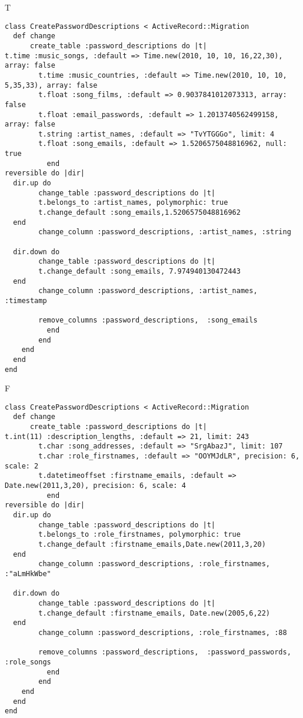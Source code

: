T
\begin{verbatim}
class CreatePasswordDescriptions < ActiveRecord::Migration
  def change
	  create_table :password_descriptions do |t|
t.time :music_songs, :default => Time.new(2010, 10, 10, 16,22,30), array: false
		t.time :music_countries, :default => Time.new(2010, 10, 10, 5,35,33), array: false
		t.float :song_films, :default => 0.9037841012073313, array: false
		t.float :email_passwords, :default => 1.2013740562499158, array: false
		t.string :artist_names, :default => "TvYTGGGo", limit: 4
		t.float :song_emails, :default => 1.5206575048816962, null: true
		  end
reversible do |dir|
  dir.up do
		change_table :password_descriptions do |t|
		t.belongs_to :artist_names, polymorphic: true
 		t.change_default :song_emails,1.5206575048816962
  end
 		change_column :password_descriptions, :artist_names, :string
   
  dir.down do
		change_table :password_descriptions do |t|
		t.change_default :song_emails, 7.974940130472443
  end
 		change_column :password_descriptions, :artist_names, :timestamp
   
		remove_columns :password_descriptions,  :song_emails 
	      end
	    end
    end 
  end
end

\end{verbatim}

F
\begin{verbatim}
class CreatePasswordDescriptions < ActiveRecord::Migration
  def change
	  create_table :password_descriptions do |t|
t.int(11) :description_lengths, :default => 21, limit: 243
		t.char :song_addresses, :default => "SrgAbazJ", limit: 107
		t.char :role_firstnames, :default => "OOYMJdLR", precision: 6, scale: 2
		t.datetimeoffset :firstname_emails, :default => Date.new(2011,3,20), precision: 6, scale: 4
		  end
reversible do |dir|
  dir.up do
		change_table :password_descriptions do |t|
		t.belongs_to :role_firstnames, polymorphic: true
 		t.change_default :firstname_emails,Date.new(2011,3,20)
  end
 		change_column :password_descriptions, :role_firstnames, :"aLmHkWbe"
   
  dir.down do
		change_table :password_descriptions do |t|
		t.change_default :firstname_emails, Date.new(2005,6,22)
  end
 		change_column :password_descriptions, :role_firstnames, :88
   
		remove_columns :password_descriptions,  :password_passwords, :role_songs 
	      end
	    end
    end 
  end
end

\end{verbatim}

